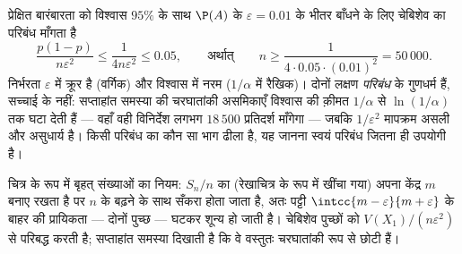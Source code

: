 \begin{example}[$n$ कितना बड़ा होना चाहिए?]\label{ex:b2:randomvar:llnnumeric}
प्रेक्षित बारंबारता को विश्वास $95\%$ के साथ $\P(A)$ के $\varepsilon = 0.01$ के भीतर बाँधने
के लिए चेबिशेव का परिबंध माँगता है
\[
\frac{p(1-p)}{n\varepsilon^2} \leq \frac{1}{4n\varepsilon^2}
\leq 0.05,
\qquad\text{अर्थात्}\qquad
n \geq \frac{1}{4\cdot0.05\cdot(0.01)^2} = 50\,000 .
\]
निर्भरता $\varepsilon$ में क्रूर है (वर्गिक) और विश्वास में नरम ($1/\alpha$ में
रैखिक)। दोनों लक्षण \emph{परिबंध} के गुणधर्म हैं, सच्चाई के नहीं:
सप्ताहांत समस्या की चरघातांकी असमिकाएँ विश्वास की क़ीमत $1/\alpha$ से
$\ln(1/\alpha)$ तक घटा देती हैं --- वहाँ वही विनिर्देश लगभग $18\,500$ प्रतिदर्श
माँगेगा --- जबकि $1/\varepsilon^2$ मापक्रम असली और असुधार्य है। किसी परिबंध का
कौन सा भाग ढीला है, यह जानना स्वयं परिबंध जितना ही उपयोगी है।
\end{example}

\begin{omfigure}

{\small चित्र के रूप में बृहत् संख्याओं का नियम: $S_n/n$ का 
(रेखाचित्र के रूप में खींचा गया) अपना केंद्र $m$ बनाए रखता है पर
$n$ के बढ़ने के साथ सँकरा होता जाता है, अतः पट्टी $\intcc{m-\varepsilon}{m+\varepsilon}$ के बाहर की
प्रायिकता --- दोनों पुच्छ --- घटकर शून्य हो जाती है। चेबिशेव
पुच्छों को $V(X_1)/(n\varepsilon^2)$ से परिबद्ध करती है; सप्ताहांत समस्या दिखाती है कि वे
वस्तुतः चरघातांकी रूप से छोटी हैं।}
\end{omfigure}

